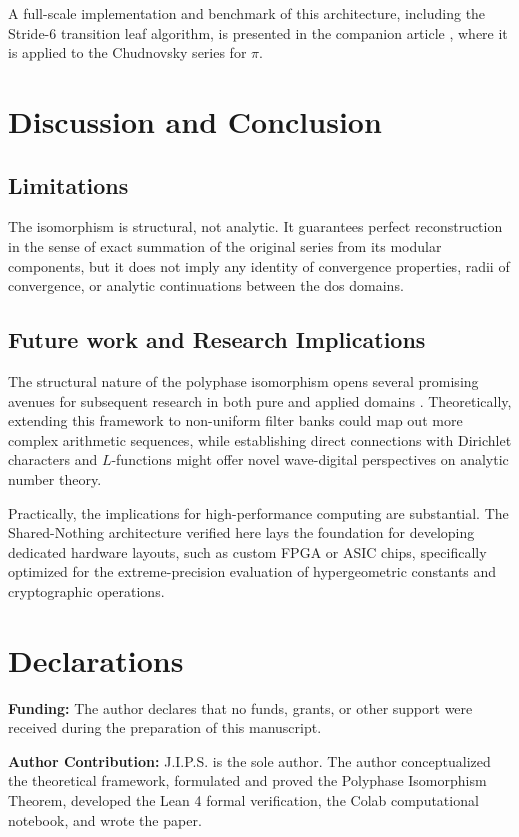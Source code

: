 \documentclass{article}
\theoremstyle{plain}
\theoremstyle{definition}
\theoremstyle{remark}
\begin{document}
A full-scale implementation and benchmark of this architecture, including the Stride-6 transition leaf algorithm, is presented in the companion article \cite{peinador_modular}, where it is applied to the Chudnovsky series for \(\pi\).

\section{Discussion and Conclusion}
\label{sec:conclusion}

\subsection{Limitations}
The isomorphism is structural, not analytic. It guarantees perfect reconstruction in the sense of exact summation of the original series from its modular components, but it does not imply any identity of convergence properties, radii of convergence, or analytic continuations between the dos domains.

\subsection{Future work and Research Implications}
The structural nature of the polyphase isomorphism opens several promising avenues for subsequent research in both pure and applied domains \cite{vaidyanathan}. Theoretically, extending this framework to non-uniform filter banks could map out more complex arithmetic sequences, while establishing direct connections with Dirichlet characters and $L$-functions might offer novel wave-digital perspectives on analytic number theory. 

Practically, the implications for high-performance computing are substantial. The Shared-Nothing architecture verified here lays the foundation for developing dedicated hardware layouts, such as custom FPGA or ASIC chips, specifically optimized for the extreme-precision evaluation of hypergeometric constants and cryptographic operations.

\section*{Declarations}

\textbf{Funding:} The author declares that no funds, grants, or other support were received during the preparation of this manuscript.

\vspace{0.5em}
\noindent\textbf{Author Contribution:} J.I.P.S. is the sole author. The author conceptualized the theoretical framework, formulated and proved the Polyphase Isomorphism Theorem, developed the Lean 4 formal verification, the Colab computational notebook, and wrote the paper.
\end{document}
